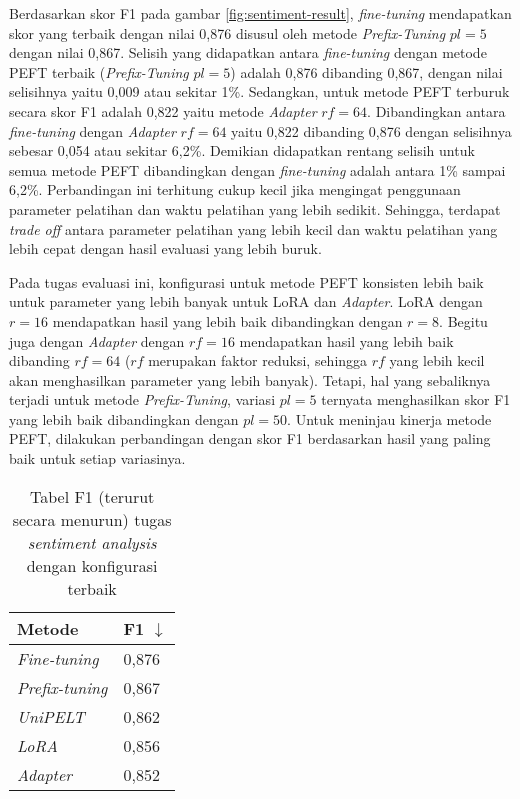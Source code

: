 Berdasarkan skor F1 pada gambar \ref{fig:sentiment-result}, \textit{fine-tuning} mendapatkan skor yang terbaik dengan nilai 0,876 disusul oleh metode \textit{Prefix-Tuning} $pl=5$ dengan nilai 0,867. Selisih yang didapatkan antara \textit{fine-tuning} dengan metode PEFT terbaik (\textit{Prefix-Tuning} $pl=5$) adalah 0,876 dibanding 0,867, dengan nilai selisihnya yaitu 0,009 atau sekitar 1\%. Sedangkan, untuk metode PEFT terburuk secara skor F1 adalah 0,822 yaitu metode \textit{Adapter} $rf=64$. Dibandingkan antara \textit{fine-tuning} dengan \textit{Adapter} $rf=64$ yaitu 0,822 dibanding 0,876 dengan selisihnya sebesar 0,054 atau sekitar 6,2\%. Demikian didapatkan rentang selisih untuk semua metode PEFT dibandingkan dengan \textit{fine-tuning} adalah antara 1\% sampai 6,2\%. Perbandingan ini terhitung cukup kecil jika mengingat penggunaan parameter pelatihan dan waktu pelatihan yang lebih sedikit. Sehingga, terdapat \textit{trade off} antara parameter pelatihan yang lebih kecil dan waktu pelatihan yang lebih cepat dengan hasil evaluasi yang lebih buruk.

Pada tugas evaluasi ini, konfigurasi untuk metode PEFT konsisten lebih baik untuk parameter yang lebih banyak untuk LoRA dan \textit{Adapter}. LoRA dengan $r=16$ mendapatkan hasil yang lebih baik dibandingkan dengan $r=8$. Begitu juga dengan \textit{Adapter} dengan $rf=16$ mendapatkan hasil yang lebih baik dibanding $rf=64$ ($rf$ merupakan faktor reduksi, sehingga $rf$ yang lebih kecil akan menghasilkan parameter yang lebih banyak). Tetapi, hal yang sebaliknya terjadi untuk metode \textit{Prefix-Tuning}, variasi $pl=5$ ternyata menghasilkan skor F1 yang lebih baik dibandingkan dengan $pl=50$. Untuk meninjau kinerja metode PEFT, dilakukan perbandingan dengan skor F1 berdasarkan hasil yang paling baik untuk setiap variasinya.

\begin{table}[h]
    \centering
    \caption{Tabel F1 (terurut secara menurun) tugas \textit{sentiment analysis} dengan konfigurasi terbaik}
    \label{table:sentiment-result-desc}
    \begin{tabular}{l|l}
        \toprule
        \textbf{Metode} & \textbf{F1 $\downarrow$} \\
        \midrule
        \textit{Fine-tuning} & 0,876 \\
        \textit{Prefix-tuning} & 0,867 \\
        \textit{UniPELT} & 0,862 \\
        \textit{LoRA} & 0,856 \\
        \textit{Adapter} & 0,852 \\
        \bottomrule
    \end{tabular}
\end{table}

